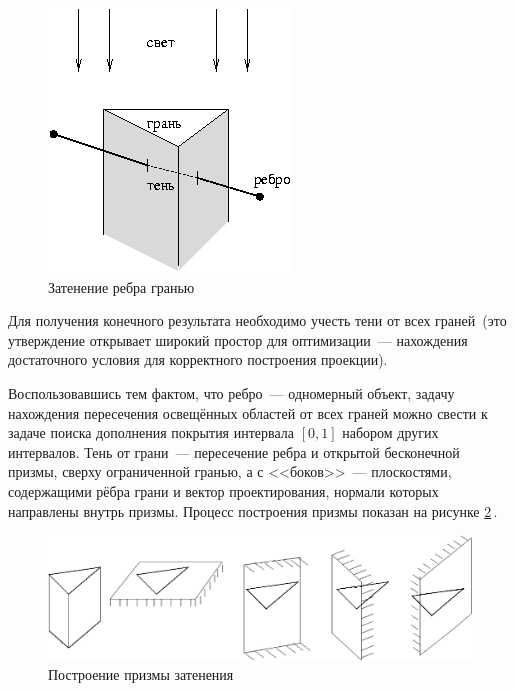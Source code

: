 \begin{figure}[ht!]
\begin{center}
\includegraphics[scale=1]{images/pol_shad.png}
\caption{Затенение ребра гранью} \label{fig:poly_shadow}
\end{center}
\end{figure}

Для получения конечного результата необходимо учесть тени от всех граней~(это утверждение открывает широкий простор для оптимизации~--- нахождения достаточного условия для корректного построения проекции). 

Воспользовавшись тем фактом, что ребро~--- одномерный объект, задачу нахождения пересечения освещённых областей от всех граней можно свести к задаче поиска дополнения покрытия интервала $[0,1]$ набором других интервалов. Тень от грани~--- пересечение ребра и открытой бесконечной призмы, сверху ограниченной гранью, а с <<боков>>~--- плоскостями, содержащими рёбра грани и вектор проектирования, нормали которых направлены внутрь призмы. Процесс построения призмы показан на рисунке \ref{fig:poly_prism}\,.

\begin{figure}[ht!]
\begin{center}
\includegraphics[scale=0.6]{images/pol_prism.png}
\caption{Построение призмы затенения} \label{fig:poly_prism}
\end{center}
\end{figure}

